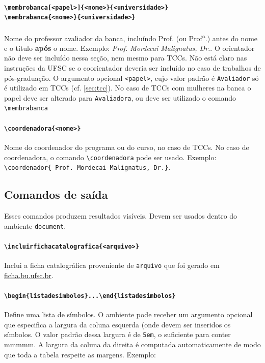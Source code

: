 \documentclass[embeddedlogo]{../ufsc-thesis-rn46-2019}
\newcommand{\lacmd}[1]{\texttt{\textbackslash{}#1}}
\newcommand{\laenv}[1]{\texttt{\textbackslash{}begin\{#1\}...\textbackslash{}end\{#1\}}}
\begin{document}
\paragraph*{\lacmd{membrobanca[<papel>]\{<nome>\}\{<universidade>\}} \\
            \lacmd{membrabanca\{<nome>\}\{<universidade>\}}}
Nome do professor avaliador da banca, incluíndo Prof. (ou
Prof\textsuperscript{a}.) antes do nome e o título \textbf{após} o
nome. Exemplo: \emph{Prof. Mordecai Malignatus, Dr.}. O orientador não deve ser
incluído nessa seção, nem mesmo para TCCs. Não está claro nas instruções da UFSC
se o coorientador deveria ser incluído no caso de trabalhos de pós-graduação. O
argumento opcional \texttt{<papel>}, cujo valor padrão é \texttt{Avaliador} só é
utilizado em TCCs (cf. \autoref{sec:tcc}). No caso de TCCs com mulheres na banca
o papel deve ser alterado para \texttt{Avaliadora}, ou deve ser utilizado o
comando \lacmd{membrabanca}

\paragraph*{\lacmd{coordenadora\{<nome>\}}} Nome do coordenador do programa ou
do curso, no caso de TCCs. No caso de coordenadora, o comando
\lacmd{coordenadora} pode ser usado. Exemplo: \lacmd{coordenador\{
  Prof. Mordecai Malignatus, Dr.\}}.

\subsection{Comandos de saída}

Esses comandos produzem resultados visíveis. Devem ser usados dentro do
ambiente \texttt{document}.

\paragraph*{\lacmd{incluirfichacatalografica\{<arquivo>\}}}
Inclui a ficha catalográfica proveniente de \texttt{arquivo} que foi gerado em
\href{http://ficha.bu.ufsc.br/}{ficha.bu.ufsc.br}.

\paragraph*{\laenv{listadesimbolos}}
Define uma lista de símbolos. O ambiente pode receber um argumento opcional que
especifica a largura da coluna esquerda (onde devem ser inseridos os símbolos. O
valor padrão dessa largura é de \texttt{5em}, o suficiente para conter mmmmm. A
largura da coluna da direita é computada automaticamente de modo que toda a
tabela respeite as margens. Exemplo:
\end{document}
